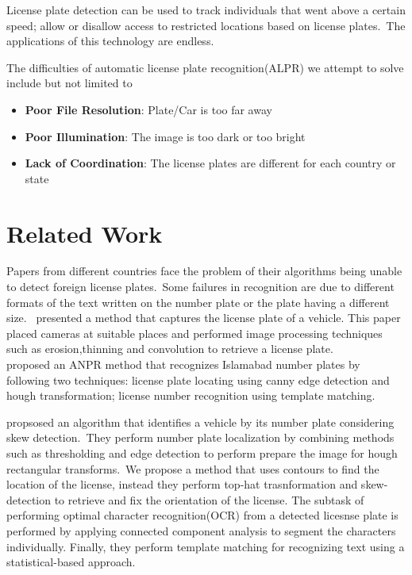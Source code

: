 \documentclass[a4paper,twoside,10pt]{report}
\begin{document}
License plate detection can be used to track individuals that went above a certain speed;  allow or disallow access to restricted locations based on license plates.\ 
The applications of this technology are endless.

The difficulties of automatic license plate recognition(ALPR) we attempt to solve include but not limited to 
\begin{itemize}
  \item \textbf{Poor File Resolution}: Plate/Car is too far away
  \item \textbf{Poor Illumination}: The image is too dark or too bright 
  \item \textbf{Lack of Coordination}: The license plates are different for each country or state 
\end{itemize}

\section{Related Work}
Papers from different countries face the problem of their algorithms being unable to detect foreign license plates.\ 
Some failures in recognition are due to different formats of the text written on the number plate or the plate having a different size.\ 
\citet*{redmon2016look} presented a method that captures the license plate of a vehicle. This paper placed cameras at suitable places and performed image processing techniques such as erosion,thinning and convolution to retrieve a license plate. \\ [4pt]

\citet*{RasheedAutomatedNP} proposed an ANPR method that recognizes Islamabad number plates by following two techniques: license plate locating using canny edge detection and hough transformation;  license number recognition using template matching.

\citet*{6510317} propsosed an algorithm that identifies a vehicle by its number plate considering skew detection.\
They perform number plate localization by combining methods such as thresholding and edge detection to perform prepare the image for hough rectangular transforms.\ 
We propose a method that uses contours to find the location of the license, instead they perform top-hat trasnformation and skew-detection to retrieve and fix the orientation of the license. 
The subtask of performing optimal character recognition(OCR) from a detected licesnse plate is performed by applying connected component analysis to segment the characters individually. Finally, they perform template matching for recognizing text using a statistical-based approach.
\end{document}

